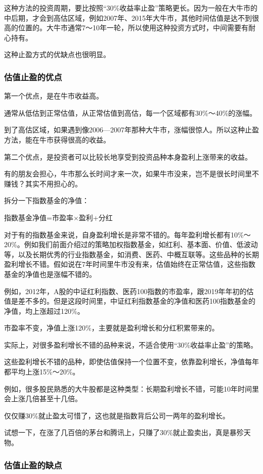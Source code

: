 这种方法的投资周期，要比按照“30\%收益率止盈”策略更长。因为一般在大牛市的中后期，才会到高估区域，例如2007年、2015年大牛市，其他时间估值是达不到很高的位置的。大牛市通常7～10年一轮，所以使用这种投资方式时，中间需要有耐心持有。

这种止盈方式的优缺点也很明显。

\subsubsection{估值止盈的优点}

第一个优点，是在牛市收益高。

通常从低估到正常估值，从正常估值到高估，每一个区域都有30\%～40\%的涨幅。

到了高估区域，如果遇到像2006—2007年那种大牛市，涨幅很惊人。所以这种止盈方法，能在牛市获得很高的收益。

第二个优点，是投资者可以比较长地享受到投资品种本身盈利上涨带来的收益。

有的朋友会担心，牛市那么长时间才来一次，如果牛市没来，岂不是很长时间里不赚钱？其实不用担心的。

拆分一下指数基金的净值：

{\kaishu 指数基金净值=市盈率×盈利+分红}

对于有的指数基金来说，自身盈利增长是非常不错的。每年盈利增长都有10\%～20\%。例如我们前面介绍过的策略加权指数基金，如红利、基本面、价值、低波动等，以及长期优秀的行业指数基金，如消费、医药、中概互联等。这些品种的长期盈利增长不错。假如说在7年时间里牛市没有来，估值始终在正常估值，这些指数基金的净值也是涨幅不错的。

例如，2012年，A股的中证红利指数、医药100指数的市盈率，跟2019年年初的估值是差不多的。但是这段时间里，中证红利指数基金的净值和医药100指数基金的净值，均上涨超过120\%。

市盈率不变，净值上涨120\%，主要就是盈利增长和分红积累带来的。

实际上，对很多盈利增长不错的品种来说，不适合使用“30\%收益率止盈”的策略。

这些盈利增长不错的品种，即使估值保持一个位置不变，依靠盈利增长，净值每年都平均上涨15\%～20\%。

例如，很多股民熟悉的大牛股都是这种类型：长期盈利增长不错，可能10年时间里会上涨几倍甚至十几倍。

仅仅赚30\%就止盈太可惜了，这也就是指数背后公司一两年的盈利增长。

试想一下，在涨了几百倍的茅台和腾讯上，只赚了30\%就止盈卖出，真是暴殄天物。

\subsubsection{估值止盈的缺点}

